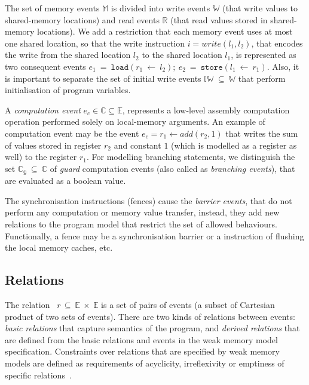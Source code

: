 The set of memory events $\mathbb{M}$ is divided into write events $\mathbb{W}$ (that write values to shared-memory locations) and read events $\mathbb{R}$ (that read values stored in shared-memory locations).
We add a restriction that each memory event uses at most one shared location, so that the write instruction $i = write(l_1, l_2)$, that encodes the write from the shared location $l_2$ to the shared location $l_1$, is represented as two consequent events $e_1~=~\mathtt{load}(r_1~\leftarrow~l_2); \ e_2~=~\mathtt{store}(l_1~\leftarrow~r_1)$.
Also, it is important to separate the set of initial write events $\mathbb{IW}~\subseteq~\mathbb{W}$ that perform initialisation of program variables.

A \textit{computation event} $e_c \in \mathbb{C} \subseteq \mathbb{E}$, represents a low-level assembly computation operation performed solely on local-memory arguments.
An example of computation event may be the event $e_c = r_1 \leftarrow add(r_2, 1)$ that writes the sum of values stored in register $r_2$ and constant $1$ (which is modelled as a register as well) to the register $r_1$.
For modelling branching statements, we distinguish the set $\mathbb{C_{g}}~\subseteq~\mathbb{C}$ of \textit{guard} computation events (also called as \textit{branching events}), that are evaluated as a boolean value.

The synchronisation instructions (fences) cause the \textit{barrier events}, that do not perform any computation or memory value transfer, instead, they add new relations to the program model that restrict the set of allowed behaviours.
Functionally, a fence may be a synchronisation barrier or a instruction of flushing the local memory caches, etc.


\subsection{Relations}
\label{ch:wmm:model:relations}


The relation~%
$r\,\subseteq~\mathbb{E}~\times~\mathbb{E}$ is a set of pairs of events (a subset of Cartesian product of two sets of events). There are two kinds of relations between events: \textit{basic relations} %
that capture semantics of the program, and \textit{derived relations} that are defined from the basic relations and events in the weak memory model specification. Constraints over relations that are specified by weak memory models are defined as requirements of acyclicity, irreflexivity or emptiness of specific relations~\cite{alglave2016syntax}.

